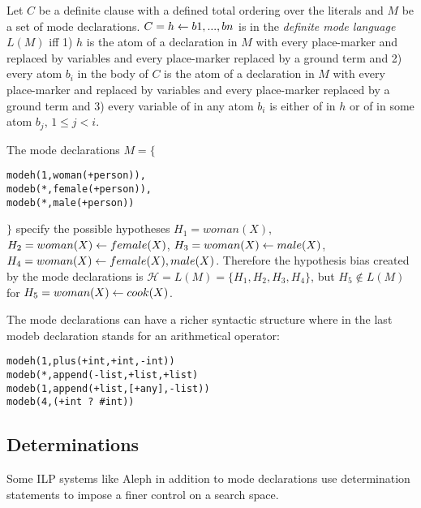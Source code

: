 \begin{defn}\label{definition_definite_mode_language}\cite{muggleton1995inverse}
Let $C$ be a definite clause with a
defined total ordering over the literals and $M$ be a set of mode declarations.
$C = h \leftarrow b1, ..., bn$ is in the \emph{definite mode language} $L(M)$ iff 1) $h$ is the atom
of a  declaration in $M$ with every place-marker  and  replaced by
variables and every place-marker  replaced by a ground term and 2) every
atom $b_i$ in the body of $C$ is the atom of a  declaration in $M$ with every
place-marker  and  replaced by variables and every place-marker 
replaced by a ground term and 3) every variable of  in any atom $b_i$ is either
of  in $h$ or of  in some atom $b_j$, $1 \le j < i$.
\end{defn}

\begin{exmp}
The mode declarations $M=\{$
\begin{lstlisting}
modeh(1,woman(+person)),
modeb(*,female(+person)),
modeb(*,male(+person))
\end{lstlisting}
$\}$
specify the possible hypotheses
$H_1=woman(X)$,
$H_2=woman(X) \leftarrow female(X)$,
$H_3=woman(X) \leftarrow male(X)$,
$H_4=woman(X) \leftarrow female(X), male(X)$.
Therefore the hypothesis bias created by the mode declarations 
is $\mathcal{H}=L(M)=\{H_1, H_2, H_3, H_4\}$, but $H_5 \not\in L(M)$ for
$H_5=woman(X) \leftarrow cook(X)$.
\end{exmp}

The mode declarations can have a richer syntactic structure where  in the last modeb declaration stands for an arithmetical operator:
\begin{exmp}\cite{muggleton1995inverse}
\begin{lstlisting}
modeh(1,plus(+int,+int,-int))
modeb(*,append(-list,+list,+list)
modeb(1,append(+list,[+any],-list))
modeb(4,(+int ? #int))
\end{lstlisting}
\end{exmp}

\subsection{Determinations}\label{bias_determinations}
Some ILP systems like Aleph \cite{aleph2007} in addition to mode declarations use determination statements to impose a finer control on a search space.

